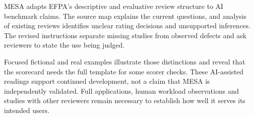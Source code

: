 \documentclass[conference]{IEEEtran}
\begin{document}
    MESA adapts EFPA's descriptive and evaluative review structure to AI benchmark claims. The source map explains the current questions, and analysis of existing reviews identifies unclear rating decisions and unsupported inferences. The revised instructions separate missing studies from observed defects and ask reviewers to state the use being judged.

    Focused fictional and real examples illustrate those distinctions and reveal that the scorecard needs the full template for some scorer checks. These AI-assisted readings support continued development, not a claim that MESA is independently validated. Full applications, human workload observations and studies with other reviewers remain necessary to establish how well it serves its intended users.

\balance


\end{document}

